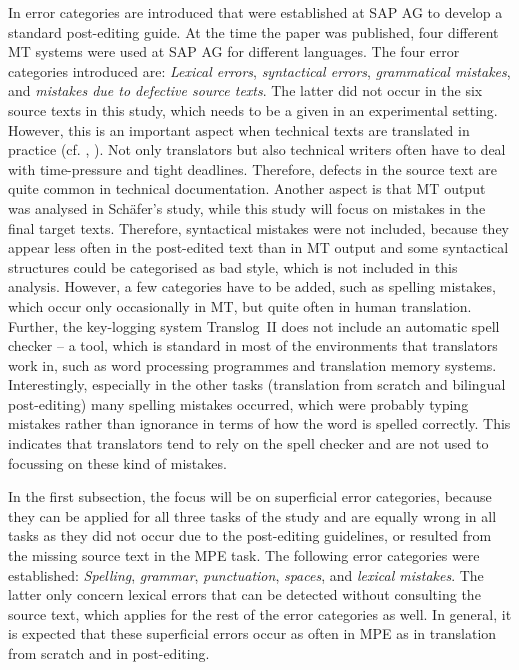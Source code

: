 \documentclass[output=paper]{langsci/langscibook}
\begin{document}
In \citet{Schafer2003} error categories are introduced that were established at SAP AG to develop a standard post-editing guide. At the time the paper was published, four different MT systems were used at SAP AG for different languages. The four error categories introduced are: \textit{Lexical errors}, \textit{syntactical errors}, \textit{grammatical mistakes}, and \textit{mistakes due to defective source texts}. The latter did not occur in the six source texts in this study, which needs to be a given in an experimental setting. However, this is an important aspect when technical texts are translated in practice (cf. \citet{hornhelf1999}, \citet{hornhelf2007}). Not only translators but also technical writers often have to deal with time-pressure and tight deadlines. Therefore, defects in the source text are quite common in technical documentation. Another aspect is that MT output was analysed in Schäfer's study, while this study will focus on mistakes in the final target texts. Therefore, syntactical mistakes were not included, because they appear less often in the post-edited text than in MT output and some syntactical structures could be categorised as bad style, which is not included in this analysis. However, a few categories have to be added, such as spelling mistakes, which occur only occasionally in MT, but quite often in human translation. Further, the key-logging system Translog~II does not include an automatic spell checker – a tool, which is standard in most of the environments that translators work in, such as word processing programmes and translation memory systems. Interestingly, especially in the other tasks (translation from scratch and bilingual post-editing) many spelling mistakes occurred, which were probably typing mistakes rather than ignorance in terms of how the word is spelled correctly. This indicates that translators tend to rely on the spell checker and are not used to focussing on these kind of mistakes.



In the first subsection, the focus will be on superficial error categories, because they can be applied for all three tasks of the study and are equally wrong in all tasks as they did not occur due to the post-editing guidelines, or resulted from the missing source text in the MPE task. The following error categories were established: \textit{Spelling},\textit{ grammar}, \textit{punctuation}, \textit{spaces}, and \textit{lexical mistakes}. The latter only concern lexical errors that can be detected without consulting the source text, which applies for the rest of the error categories as well. In general, it is expected that these superficial errors occur as often in MPE as in translation from scratch and in post-editing.
\end{document}

